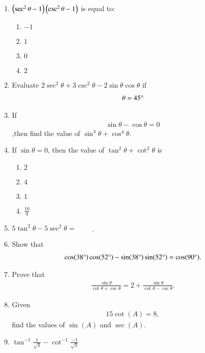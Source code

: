 \begin{enumerate}[label=\thesubsection.\arabic*.,ref=\thesubsection.\theenumi]
    \hfill{}\item $\left(\sec^2\theta - 1\right)\left(\csc^2\theta - 1\right)$  is equal to:
    \begin{enumerate}
   \item $-1$
   \item  $1$
   \item  $0$
   \item  $2$
        \end{enumerate}
   \hfill{}\item Evaluate $2\sec^2\theta+3\csc^2\theta-2\sin\theta\cos\theta$ if
   \begin{align}
      \theta=45\degree
   \end{align}
   
   \hfill{}\item If
   \begin{align}
       \sin\theta-\cos\theta=0
   \end{align}
   ,then find the value of $\sin^4\theta+\cos^4\theta$.
  \hfill{}
    \item If $\sin \theta=0$, then the value of $\tan^2\theta+\cot^2\theta$ is
    \begin{enumerate}
        \item $2$
        \item $4$
        \item $1$
        \item $\frac{10}{9}$
    \end{enumerate}
    \hfill{}\item $5\tan^2 \theta - 5\sec^2\theta = \underline{\hspace{2cm}}$
   \hfill{}\item Show that 
    \begin{align}
        \cos(38\degree) \cos(52\degree) - \sin(38\degree)\sin(52\degree) = \cos(90\degree).
    \end{align}
    \hfill{}\item Prove that 
    \begin{align}
        \frac{\sin\theta}{\cot\theta+\csc\theta} = 2+\frac{\sin\theta}{\cot\theta-\csc\theta}.
    \end{align}
    \hfill{}\item Given 
    \begin{align}
        15 \cot (A) = 8,
    \end{align}
    find the values of $\sin (A)$ and $\sec (A)$.
    \hfill{}
\item $\tan^{-1}\frac{1}{\sqrt{3}} - \cot^{-1}\frac{-1}{\sqrt{3}}$
    

\end{enumerate}
